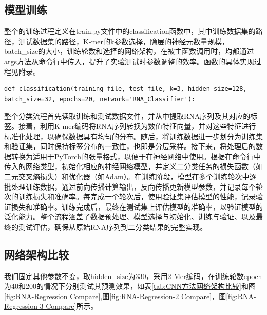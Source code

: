 \documentclass[a4paper,11pt,AutoFakeBold]{ctexart}
\begin{document}
\subsection{模型训练}

整个的训练过程定义在train.py文件中的classification函数中，其中训练数据集的路径，测试数据集的路径，K-mer的k参数选择，隐层的神经元数量规模，batch\_size的大小，训练轮数和选择的网络架构，在被主函数调用时，均都通过args方法从命令行中传入，提升了实验测试时参数调整的效率。函数的具体实现过程见附录。

\begin{lstlisting}
def classification(training_file, test_file, k=3, hidden_size=128, batch_size=32, epochs=20, network='RNA_Classifier'):
\end{lstlisting}

整个分类流程首先读取训练和测试数据文件，并从中提取RNA序列及其对应的标签。接着，利用K-mer编码将RNA序列转换为数值特征向量，并对这些特征进行标准化处理，以确保数据具有均匀的分布。随后，将训练数据进一步划分为训练集和验证集，同时保持标签分布的一致性，也即是分层采样。接下来，将处理后的数据转换为适用于PyTorch的张量格式，以便于在神经网络中使用。根据在命令行中传入的网络类型，初始化相应的神经网络模型，并定义二分类任务的损失函数（如二元交叉熵损失）和优化器（如Adam）。在训练阶段，模型在多个训练轮次中逐批处理训练数据，通过前向传播计算输出，反向传播更新模型参数，并记录每个轮次的训练损失和准确率。每完成一个轮次后，使用验证集评估模型的性能，记录验证损失和准确率。训练完成后，最终在测试集上评估模型的准确率，以验证模型的泛化能力。整个流程涵盖了数据预处理、模型选择与初始化、训练与验证、以及最终的测试评估，确保从原始RNA序列到二分类结果的完整实现。


\subsection{网络架构比较}

我们固定其他参数不变，取hidden\_size为330，采用2-Mer编码，在训练轮数epoch为40和200的情况下分别测试其预测效果，如表\ref{tab:CNN方法网络架构比较}和图\ref{fig:RNA-Regression Compare},图\ref{fig:RNA-Regression-2 Compare}，图\ref{fig:RNA-Regression-3 Compare}所示。
\end{document}
